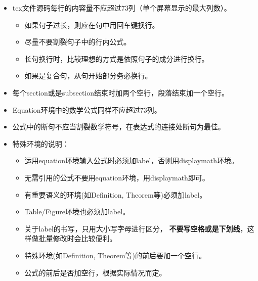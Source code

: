 \begin{itemize}
    \item tex文件源码每行的内容量不应超过73列（单个屏幕显示的最大列数）。
    \begin{itemize}
        \item 如果句子过长，则应在句中用回车键换行。
        \item 尽量不要割裂句子中的行内公式。
        \item 长句换行时，比较理想的方式是依照句子的成分进行换行。
        \item 如果是复合句，从句开始部分务必换行。
    \end{itemize}
    \item 每个section或是subsection结束时加两个空行，段落结束加一个空行。
    \item Equation环境中的数学公式同样不应超过73列。
    \item 公式中的断句不应当割裂数学符号，在表达式的连接处断句为最佳。
    \item 特殊环境的说明：
    \begin{itemize}
        \item 运用equation环境输入公式时必须加label，否则用displaymath环境。
        \item 无需引用的公式不要用equation环境，用displaymath即可。
        \item 有重要语义的环境(如Definition, Theorem等)必须加label。
        \item Table/Figure环境也必须加label。
        \item 关于label的书写，只用大小写字母进行区分，
        \textbf{不要写空格或是下划线}，这样做批量修改时会比较便利。
        \item 特殊环境(如Definition, Theorem等)的前后要加一个空行。
        \item 公式的前后是否加空行，根据实际情况而定。
    \end{itemize}
\end{itemize}